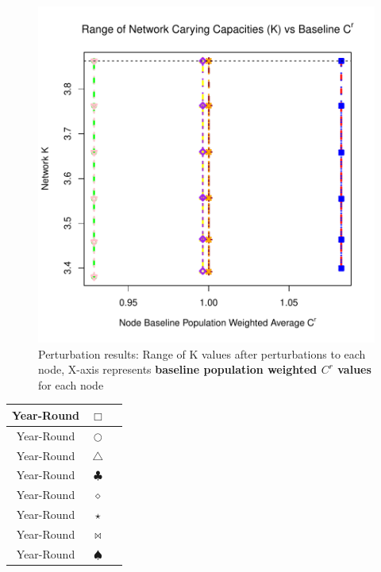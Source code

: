 \documentclass[10pt]{article}
\begin{document}
\vspace{-.5cm}
\begin{figure}[H]
\begin{center}
\includegraphics[width=.8\textwidth, height=.8\textwidth]{RGraphics-plant_barcr_averageCR}
\caption{Perturbation results: Range of K values after perturbations to each node, X-axis represents {\bf{baseline population weighted $C^r$ values}} for each node}\label{fig:plant_barcr_averageCR}
\end{center}
\end{figure}

\vspace{-.5cm}
\begin{tabular}{|c|c|c|}
\hline
{\color{red} Year-Round} & $\Box$ & \\
\hline
{\color{green} Year-Round} & $\bigcirc$ & \\
\hline
{\color{yellow} Year-Round} & $\triangle$ & \\
\hline
{\color{brown} Year-Round} & $\clubsuit$ & \\
\hline
{\color{orange} Year-Round} & $\diamond$ & \\
\hline
{\color{purple} Year-Round} & $\star$ & \\
\hline
{\color{pink} Year-Round} & $\bowtie$ & \\
\hline
{\color{blue} Year-Round} & $\spadesuit$ \\
\hline
\end{tabular}
\end{document}
